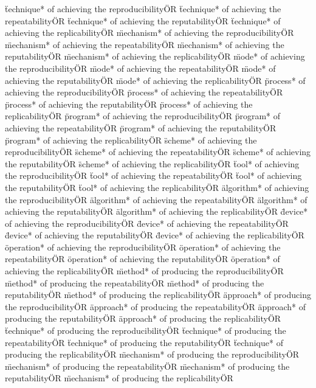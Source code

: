 \documentclass[
10pt, %
a4paper, %
oneside, %
headinclude,footinclude, %
BCOR5mm, %
]{scrartcl}
\begin{document}
\"technique* of achieving the reproducibility\" OR \"technique* of achieving the repeatability\" OR \"technique* of achieving the reputability\" OR \"technique* of achieving the replicability\" OR 
\"mechanism* of achieving the reproducibility\" OR \"mechanism* of achieving the repeatability\" OR \"mechanism* of achieving the reputability\" OR \"mechanism* of achieving the replicability\" OR 
\"mode* of achieving the reproducibility\" OR \"mode* of achieving the repeatability\" OR \"mode* of achieving the reputability\" OR \"mode* of achieving the replicability\" OR 
\"process* of achieving the reproducibility\" OR \"process* of achieving the repeatability\" OR \"process* of achieving the reputability\" OR \"process* of achieving the replicability\" OR 
\"program* of achieving the reproducibility\" OR \"program* of achieving the repeatability\" OR \"program* of achieving the reputability\" OR \"program* of achieving the replicability\" OR 
\"scheme* of achieving the reproducibility\" OR \"scheme* of achieving the repeatability\" OR \"scheme* of achieving the reputability\" OR \"scheme* of achieving the replicability\" OR 
\"tool* of achieving the reproducibility\" OR \"tool* of achieving the repeatability\" OR \"tool* of achieving the reputability\" OR \"tool* of achieving the replicability\" OR 
\"algorithm* of achieving the reproducibility\" OR \"algorithm* of achieving the repeatability\" OR \"algorithm* of achieving the reputability\" OR \"algorithm* of achieving the replicability\" OR 
\"device* of achieving the reproducibility\" OR \"device* of achieving the repeatability\" OR \"device* of achieving the reputability\" OR \"device* of achieving the replicability\" OR 
\"operation* of achieving the reproducibility\" OR \"operation* of achieving the repeatability\" OR \"operation* of achieving the reputability\" OR \"operation* of achieving the replicability\" OR 
\"method* of producing the reproducibility\" OR \"method* of producing the repeatability\" OR \"method* of producing the reputability\" OR \"method* of producing the replicability\" OR 
\"approach* of producing the reproducibility\" OR \"approach* of producing the repeatability\" OR \"approach* of producing the reputability\" OR \"approach* of producing the replicability\" OR 
\"technique* of producing the reproducibility\" OR \"technique* of producing the repeatability\" OR \"technique* of producing the reputability\" OR \"technique* of producing the replicability\" OR 
\"mechanism* of producing the reproducibility\" OR \"mechanism* of producing the repeatability\" OR \"mechanism* of producing the reputability\" OR \"mechanism* of producing the replicability\" OR 
\end{document}
